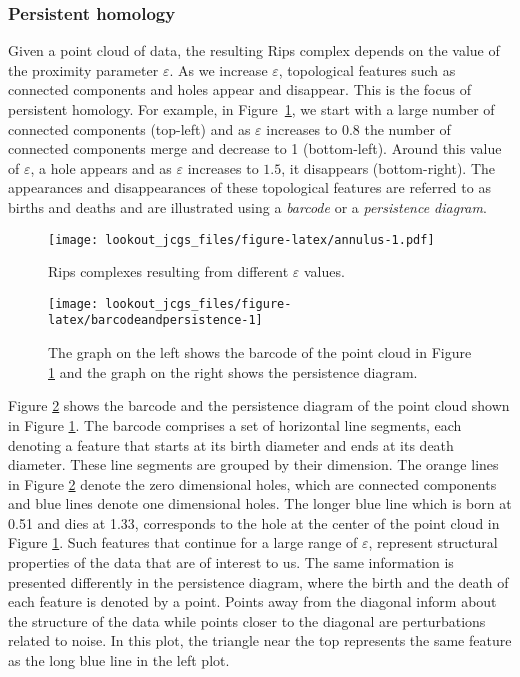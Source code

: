 \documentclass[12pt]{article}
\theoremstyle{definition}
\theoremstyle{definition}
\theoremstyle{definition}
\theoremstyle{remark}
\begin{document}
\hypertarget{persistent-homology}{%
\subsubsection*{Persistent homology}\label{persistent-homology}}

Given a point cloud of data, the resulting Rips complex depends on the value of the proximity parameter \(\varepsilon\). As we increase \(\varepsilon\), topological features such as connected components and holes appear and disappear. This is the focus of persistent homology. For example, in Figure~\ref{fig:annulus}, we start with a large number of connected components (top-left) and as \(\varepsilon\) increases to \(0.8\) the number of connected components merge and decrease to 1 (bottom-left). Around this value of \(\varepsilon\), a hole appears and as \(\varepsilon\) increases to \(1.5\), it disappears (bottom-right). The appearances and disappearances of these topological features are referred to as births and deaths and are illustrated using a \emph{barcode} or a \emph{persistence diagram}.

\begin{figure}
\centering
\texttt{[image: lookout\_jcgs\_files/figure-latex/annulus-1.pdf]}
\caption{\label{fig:annulus}Rips complexes resulting from different \(\varepsilon\) values.}
\end{figure}

\begin{figure}
\texttt{[image: lookout\_jcgs\_files/figure-latex/barcodeandpersistence-1]} \caption{The graph on the left shows the barcode of the point cloud in Figure \ref{fig:annulus} and the graph on the right shows the persistence diagram.}\label{fig:barcodeandpersistence}
\end{figure}

Figure \ref{fig:barcodeandpersistence} shows the barcode and the persistence diagram of the point cloud shown in Figure \ref{fig:annulus}. The barcode comprises a set of horizontal line segments, each denoting a feature that starts at its birth diameter and ends at its death diameter. These line segments are grouped by their dimension. The orange lines in Figure \ref{fig:barcodeandpersistence} denote the zero dimensional holes, which are connected components and blue lines denote one dimensional holes. The longer blue line which is born at 0.51 and dies at 1.33, corresponds to the hole at the center of the point cloud in Figure \ref{fig:annulus}. Such features that continue for a large range of \(\varepsilon\), represent structural properties of the data that are of interest to us. The same information is presented differently in the persistence diagram, where the birth and the death of each feature is denoted by a point. Points away from the diagonal inform about the structure of the data while points closer to the diagonal are perturbations related to noise. In this plot, the triangle near the top represents the same feature as the long blue line in the left plot.
\end{document}
